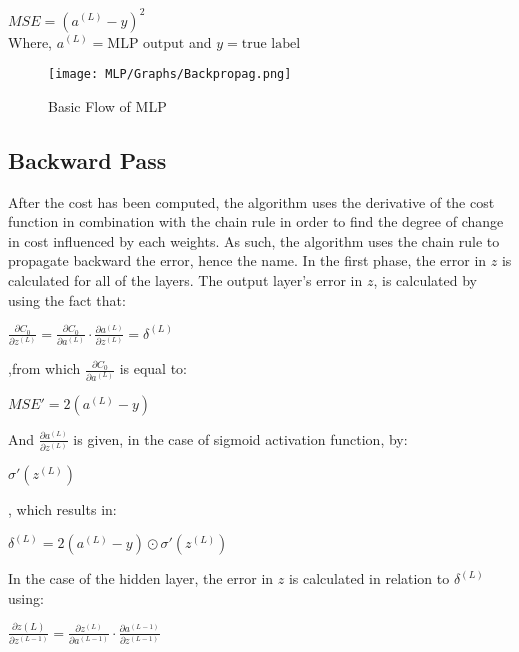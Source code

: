 \documentclass{report}
\begin{document}
\begin{center}
$MSE = (a^{(L)}-y)^2$
\\
Where, $a^{(L)} = \text{MLP output}$ and $y = \text{true label}$
\end{center}

\begin{figure}[htp]
\centering
\texttt{[image: MLP/Graphs/Backpropag.png]}
\caption{Basic Flow of MLP}
\label{Backpropagation}
\end{figure}
\break
\subsection{Backward Pass}


After the cost has been computed, the algorithm uses the derivative of the cost function in combination with the chain rule in order to find the degree of change in cost influenced by each weights. As such, the algorithm uses the chain rule to propagate backward the error, hence the name. In the first phase, the error in $z$ is calculated for all of the layers. The output layer's error in $z$, is calculated by using the fact that:

\begin{center}
$\frac{\partial C_0}{\partial z^{(L)}} = \frac{\partial C_0}{\partial a^{(L)}}\cdot \frac{\partial a^{(L)}}{\partial z^{(L)}} = \delta^{(L)}$
\end{center}


,from which $\frac{\partial C_0}{\partial a^{(L)}}$ is equal to: 
\begin{center}
$MSE'=2(a^{(L)}-y)$
\end{center}

And $\frac{\partial a^{(L)}}{\partial z^{(L)}}$ is given, in the case of sigmoid activation function, by:

\begin{center}
$ \sigma'(z^{(L)})$
\end{center}

, which results in:
\begin{center}
$ \delta^(L) = 2(a^{(L)}-y) \odot \sigma'(z^{(L)})$
\end{center}

In the case of the hidden layer, the error in $z$ is calculated in relation to $\delta^{(L)}$ using:

\begin{center}
$\frac{\partial z{(L)}}{\partial z^{(L-1)}} = \frac{\partial z^{(L)}}{\partial a^{(L-1)}}\cdot \frac{\partial a^{(L-1)}}{\partial z^{(L-1)}}$
\end{center}
\end{document}
